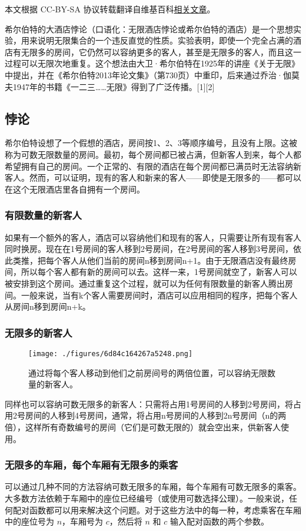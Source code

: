 
本文根据 CC-BY-SA 协议转载翻译自维基百科\href{https://en.wikipedia.org/wiki/Hilbert\%27s_paradox_of_the_Grand_Hotel}{相关文章}。

希尔伯特的大酒店悖论（口语化：无限酒店悖论或希尔伯特的酒店）是一个思想实验，用来说明无限集合的一个违反直觉的性质。实验表明，即使一个完全占满的酒店有无限多的房间，它仍然可以容纳更多的客人，甚至是无限多的客人，而且这一过程可以无限次地重复。这个想法由大卫·希尔伯特在1925年的讲座《关于无限》中提出，并在《希尔伯特2013年论文集》（第730页）中重印，后来通过乔治·伽莫夫1947年的书籍《一二三……无限》得到了广泛传播。[1][2]
\subsection{悖论}  
希尔伯特设想了一个假想的酒店，房间按1、2、3等顺序编号，且没有上限。这被称为可数无限数量的房间。最初，每个房间都已被占满，但新客人到来，每个人都希望拥有自己的房间。一个正常的、有限的酒店在每个房间都已满员时无法容纳新客人。然而，可以证明，现有的客人和新来的客人——即使是无限多的——都可以在这个无限酒店里各自拥有一个房间。
\subsubsection{有限数量的新客人}  
如果有一个额外的客人，酒店可以容纳他们和现有的客人，只需要让所有现有客人同时换房。现在在1号房间的客人移到2号房间，在2号房间的客人移到3号房间，依此类推，把每个客人从他们当前的房间n移到房间n+1。由于无限酒店没有最终房间，所以每个客人都有新的房间可以去。这样一来，1号房间就空了，新客人可以被安排到这个房间。通过重复这个过程，就可以为任何有限数量的新客人腾出房间。一般来说，当有k个客人需要房间时，酒店可以应用相同的程序，把每个客人从房间n移到房间n+k。
\subsubsection{无限多的新客人}
\begin{figure}[ht]
\centering
\texttt{[image: ./figures/6d84c164267a5248.png]}
\caption{通过将每个客人移动到他们之前房间号的两倍位置，可以容纳无限数量的新客人。} \label{fig_HPGH_1}
\end{figure}
同样也可以容纳可数无限多的新客人：只需将占用1号房间的人移到2号房间，将占用2号房间的人移到4号房间，通常，将占用n号房间的人移到2n号房间（n的两倍），这样所有奇数编号的房间（它们是可数无限的）就会空出来，供新客人使用。
\subsubsection{无限多的车厢，每个车厢有无限多的乘客 } 
可以通过几种不同的方法容纳可数无限多的车厢，每个车厢有可数无限多的乘客。大多数方法依赖于车厢中的座位已经编号（或使用可数选择公理）。一般来说，任何配对函数都可以用来解决这个问题。对于这些方法中的每一种，考虑乘客在车厢中的座位号为 \( n \)，车厢号为 \( c \)，然后将 \( n \) 和 \( c \) 输入配对函数的两个参数。


